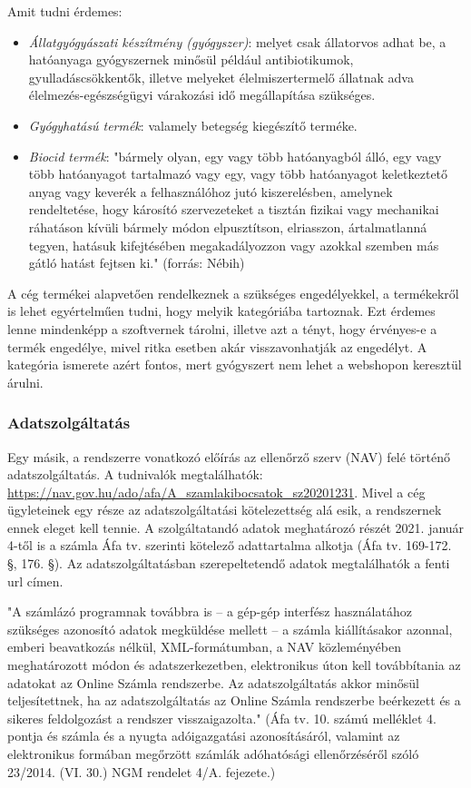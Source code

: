 \documentclass[12pt]{article}
\begin{document}
Amit tudni érdemes: 
\begin{itemize}
\item \textit{ Állatgyógyászati készítmény (gyógyszer)}: melyet csak állatorvos adhat be, a hatóanyaga gyógyszernek minősül például antibiotikumok, gyulladáscsökkentők, illetve melyeket élelmiszertermelő állatnak adva élelmezés-egészségügyi várakozási idő megállapítása szükséges.
\item \textit{Gyógyhatású termék}: valamely betegség kiegészítő terméke.
\item \textit{Biocid termék}: "bármely olyan, egy vagy több hatóanyagból álló, egy vagy több hatóanyagot tartalmazó vagy egy, vagy több hatóanyagot keletkeztető anyag vagy keverék a felhasználóhoz jutó kiszerelésben, amelynek rendeltetése, hogy károsító szervezeteket a tisztán fizikai vagy mechanikai ráhatáson kívüli bármely módon elpusztítson, elriasszon, ártalmatlanná tegyen, hatásuk kifejtésében megakadályozzon vagy azokkal szemben más gátló hatást fejtsen ki." (forrás: Nébih)
\end{itemize}

A cég termékei alapvetően rendelkeznek a szükséges engedélyekkel, a termékekről is lehet egyértelműen tudni, hogy melyik kategóriába tartoznak. Ezt érdemes lenne mindenképp a szoftvernek tárolni, illetve azt a tényt, hogy érvényes-e a termék engedélye, mivel ritka esetben akár visszavonhatják az engedélyt. A kategória ismerete azért fontos, mert gyógyszert nem lehet a webshopon keresztül árulni.

\subsubsection{Adatszolgáltatás}
Egy másik, a rendszerre vonatkozó előírás az ellenőrző szerv (NAV) felé történő adatszolgáltatás. A tudnivalók megtalálhatók: \url{https://nav.gov.hu/ado/afa/A_szamlakibocsatok_sz20201231}. Mivel a cég ügyleteinek egy része az adatszolgáltatási kötelezettség alá esik, a rendszernek ennek eleget kell tennie. A szolgáltatandó adatok meghatározó részét 2021. január 4-től is a számla Áfa tv. szerinti kötelező adattartalma alkotja (Áfa tv. 169-172. \S, 176. \S). Az adatszolgáltatásban szerepeltetendő adatok megtalálhatók a fenti url címen.

"A számlázó programnak továbbra is – a gép-gép interfész használatához szükséges azonosító adatok megküldése mellett – a számla kiállításakor azonnal, emberi beavatkozás nélkül, XML-formátumban, a NAV közleményében meghatározott módon és adatszerkezetben, elektronikus úton kell továbbítania az adatokat az Online Számla rendszerbe. Az adatszolgáltatás akkor minősül teljesítettnek, ha az adatszolgáltatás az Online Számla rendszerbe beérkezett és a sikeres feldolgozást a rendszer visszaigazolta." (Áfa tv. 10. számú melléklet 4. pontja és számla és a nyugta adóigazgatási azonosításáról, valamint az elektronikus formában megőrzött számlák adóhatósági ellenőrzéséről szóló 23/2014. (VI. 30.) NGM rendelet 4/A. fejezete.)
\end{document}
